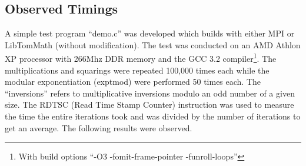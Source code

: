 \documentclass{article}
\begin{document}
\subsection{Observed Timings}
A simple test program ``demo.c'' was developed which builds with either MPI or LibTomMath (without modification).  The
test was conducted on an AMD Athlon XP processor with 266Mhz DDR memory and the GCC 3.2 compiler\footnote{With build
options ``-O3 -fomit-frame-pointer -funroll-loops''}.    The multiplications and squarings were repeated 100,000 times 
each while the modular exponentiation (exptmod) were performed 50 times each.  The ``inversions'' refers to multiplicative
inversions modulo an odd number of a given size.  The RDTSC (Read Time Stamp Counter) instruction was used to measure the 
time the entire iterations took and was divided by the number of iterations to get an average.  The following results 
were observed.
\end{document}
